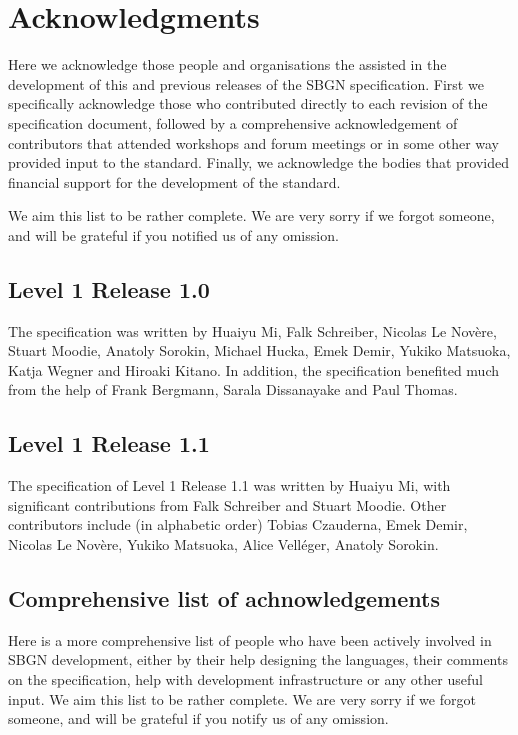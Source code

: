 \chapter{Acknowledgments}\label{sec:acknowledgments}

Here we acknowledge those people and organisations the assisted in the development of this and previous releases of the SBGN \AFl specification. First we specifically acknowledge those who contributed directly to each revision of the  specification document, followed by a comprehensive acknowledgement of contributors that attended workshops and forum meetings or in some other way provided input to the standard. Finally, we acknowledge the bodies that provided financial support for the development of the standard.


 We aim this list to be rather complete. We are very sorry if we forgot someone, and will be grateful if you notified us of any omission.

\section{Level 1 Release 1.0}

The specification was written by Huaiyu Mi, Falk Schreiber, Nicolas Le Nov\`{e}re, Stuart Moodie, Anatoly Sorokin, Michael Hucka, Emek Demir, Yukiko Matsuoka, Katja Wegner and Hiroaki Kitano. In addition, the specification benefited much from the help of Frank Bergmann, Sarala Dissanayake and Paul Thomas.

\section{Level 1 Release 1.1}
The specification of \AF Level 1 Release 1.1 was written by Huaiyu Mi, with significant contributions from Falk Schreiber and Stuart Moodie.  Other contributors include (in alphabetic order) Tobias Czauderna, Emek Demir, Nicolas Le Nov\`{e}re, Yukiko Matsuoka, Alice Vell\'{e}ger, Anatoly Sorokin.

\section{Comprehensive list of achnowledgements}

Here is a more comprehensive list of people who have been actively involved in SBGN development, either by their help designing the languages, their comments on the specification, help with development infrastructure or any other useful input.  We aim this list to be rather complete. We are very sorry if we forgot someone, and will be grateful if you notify us of any omission.

